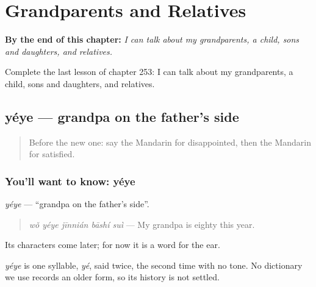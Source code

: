 
\chapter{Grandparents and Relatives}
\label{ch:zh-grandparents-and-relatives}

\begin{chapteropening}
\textbf{By the end of this chapter:} \emph{I can talk about my grandparents, a child, sons and daughters, and relatives.}

Complete the last lesson of chapter 253: I can talk about my grandparents, a child, sons and daughters, and relatives.
\end{chapteropening}

\section[yéye]{yéye — grandpa on the father's side}

\label{lesson:ZH-C253-yeye}



\begin{quote}
Before the new one: say the Mandarin for disappointed, then the Mandarin for satisfied.
\end{quote}

\subsection*{You'll want to know: yéye}
\emph{yéye} — \textquotedblleft{}grandpa on the father's side\textquotedblright{}.

\begin{quote}
\emph{wǒ yéye jīnnián bāshí suì} — My grandpa is eighty this year.
\end{quote}

Its characters come later; for now it is a word for the ear.

\begin{cousinweb}
\emph{yéye} is one syllable, \emph{yé}, said twice, the second time with no tone. No dictionary we use records an older form, so its history is not settled.
\end{cousinweb}


